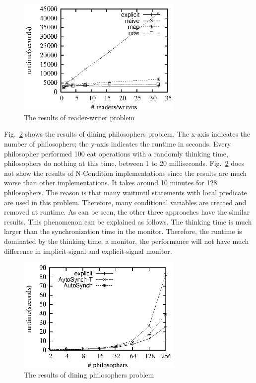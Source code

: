 \documentclass[preprint]{sigplanconf}
\begin{document}
\begin{figure}[ht!]
  \centering
  \includegraphics[width=80mm]{fig/rw.eps}
  \caption{The results of reader-writer problem}
  \label{fig:rw_eval}
\end{figure}

Fig.~\ref{fig:dp_eval} shows the results of dining philosophers problem. The
x-axis indicates the number of philosophers; the y-axis indicates the
runtime in seconds. Every philosopher performed 100 eat operations with a
randomly thinking time, philosophers do nothing at this time, between 1 to 20 
milliseconds. Fig.~\ref{fig:dp_eval} does not show the results of N-Condition 
implementations since the results are much worse than other implementations. It
takes around 10 minutes for 128 philosophers. The reason is that many waituntil
statements with local predicate are used in this problem. Therefore, many
conditional variables are created and removed at runtime. As can be seen, the
other three approaches have the similar results. This phenomenon can be
explained as follows. The thinking time is much larger than the synchronization 
time in the monitor. Therefore, the runtime is dominated by the thinking time.
a monitor, the performance will not have much difference in implicit-signal and
explicit-signal monitor.


\begin{figure}[ht!]
  \centering
  \includegraphics[width=80mm]{fig/dp.eps}
  \caption{The results of dining philosophers problem}
  \label{fig:dp_eval}
\end{figure}
\end{document}
